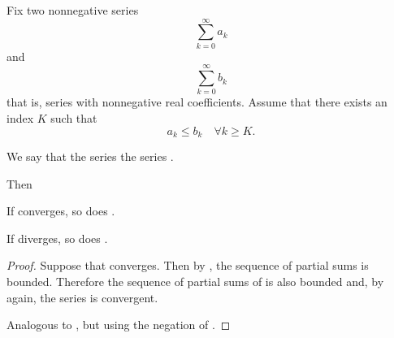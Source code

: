 \begin{proposition}\label{thm:positive_series_comparison}
  Fix two nonnegative series
  \begin{equation}\label{def:positive_series_comparison/a}
    \sum_{k=0}^\infty a_k
  \end{equation}
  and
  \begin{equation}\label{def:positive_series_comparison/b}
    \sum_{k=0}^\infty b_k
  \end{equation}
  that is, series with nonnegative real coefficients. Assume that there exists an index \( K \) such that
  \begin{equation*}
    a_k \leq b_k \quad\forall k \geq K.
  \end{equation*}

  We say that the series   the series .

  Then
  \begin{PropEnum}
     If  converges, so does .

     If  diverges, so does .
  \end{PropEnum}
\end{proposition}
\begin{proof}
   Suppose that  converges. Then by , the sequence of partial sums is bounded. Therefore the sequence of partial sums of  is also bounded and, by  again, the series is convergent.

   Analogous to , but using the negation of .
\end{proof}


